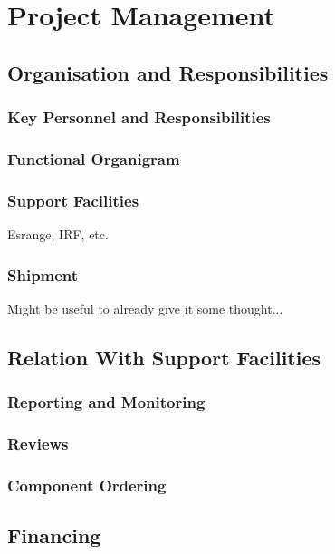 \chapter{Project Management}
\label{chap:project_management}

\section{Organisation and Responsibilities}

\subsection{Key Personnel and Responsibilities}

\subsection{Functional Organigram}

\subsection{Support Facilities}

Esrange, IRF, etc.

\subsection{Shipment}

Might be useful to already give it some thought...

\section{Relation With Support Facilities}

\subsection{Reporting and Monitoring}

\subsection{Reviews}

\subsection{Component Ordering}

\section{Financing}


